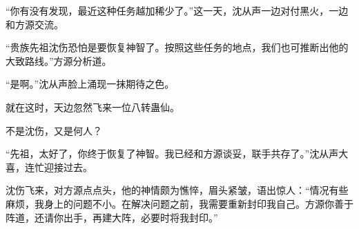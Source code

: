 \begin{this_body}
“你有没有发现，最近这种任务越加稀少了。”这一天，沈从声一边对付黑火，一边和方源交流。

“贵族先祖沈伤恐怕是要恢复神智了。按照这些任务的地点，我们也可推断出他的大致路线。”方源分析道。

“是啊。”沈从声脸上涌现一抹期待之色。

就在这时，天边忽然飞来一位八转蛊仙。

不是沈伤，又是何人？

“先祖，太好了，你终于恢复了神智。我已经和方源谈妥，联手共存了。”沈从声大喜，连忙迎接过去。

沈伤飞来，对方源点点头，他的神情颇为憔悴，眉头紧皱，语出惊人：“情况有些麻烦，我身上的问题不小。在解决问题之前，我需要重新封印我自己。方源你善于阵道，还请你出手，再建大阵，必要时将我封印。”

\end{this_body}

